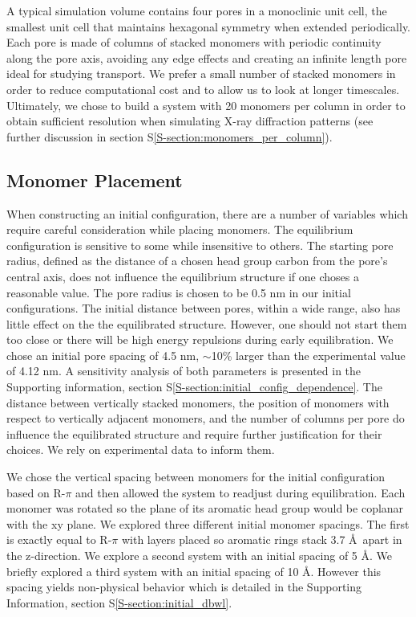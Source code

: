 \documentclass[journal=jpcbfk,manuscript=article]{achemso}
\begin{document}
  A typical simulation volume contains four pores in a monoclinic unit cell,
  the smallest unit cell that maintains hexagonal symmetry when extended
  periodically. Each pore is made of columns of stacked monomers with periodic
  continuity along the pore axis, avoiding any edge effects and creating an
  infinite length pore ideal for studying transport. We prefer a small number of stacked
  monomers in order to reduce computational cost and to allow us to look at
  longer timescales. Ultimately, we chose to build a system with 20 monomers
  per column in order to obtain sufficient resolution when simulating
  X-ray diffraction patterns (see further discussion in section S\ref{S-section:monomers_per_column}).
 
  \subsection{Monomer Placement} 

  When constructing an initial configuration, there are a number of variables
  which require careful consideration while placing monomers. The equilibrium
  configuration is sensitive to some while insensitive to others. The starting
  pore radius, defined as the distance of a chosen head group carbon from the
  pore's central axis, does not influence the equilibrium structure if one choses
  a reasonable value. The pore radius is chosen to be 0.5 nm in our initial
  configurations. The initial distance between pores, within a wide range, also has 
  little effect on the the equilibrated structure. However, one should not start them
  too close or there will be high energy repulsions during early equilibration. We 
  chose an initial pore spacing of 4.5 nm, $\sim$10\% larger than the experimental value
  of 4.12 nm. A sensitivity analysis of both parameters is presented in the 
  Supporting information, section S\ref{S-section:initial_config_dependence}. The 
  distance between vertically stacked monomers, the position of monomers with respect 
  to vertically adjacent monomers, and the number of columns per pore do influence the 
  equilibrated structure and require further justification for their choices. We rely on 
  experimental data to inform them. 

  We chose the vertical spacing between monomers for the initial configuration based
  on R-$\pi$ and then allowed the system to readjust during equilibration. Each monomer was
  rotated so the plane of its aromatic head group would be coplanar with the xy plane. We
  explored three different initial monomer spacings. The first is exactly
  equal to R-$\pi$ with layers placed so aromatic rings stack 3.7 \AA~apart in
  the z-direction. We explore a second system with an initial spacing of 5
  \AA. We briefly explored a third system with an initial spacing of 10
  \AA. However this spacing yields non-physical behavior which is detailed in the 
  Supporting Information, section S\ref{S-section:initial_dbwl}. 
\end{document}
